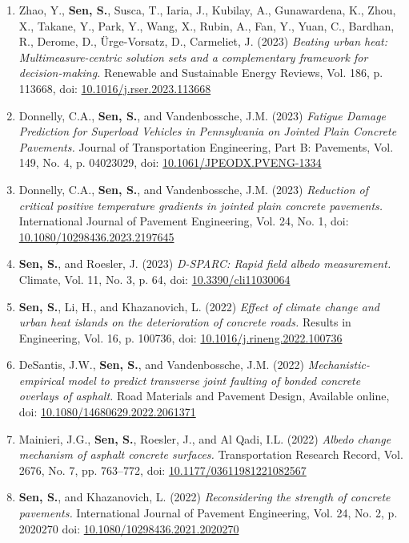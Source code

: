 \documentclass[12pt]{article}
\begin{document}
\begin{enumerate}
	\item Zhao, Y., \textbf{Sen, S.}, Susca, T., Iaria, J., Kubilay, A., Gunawardena, K., Zhou, X., Takane, Y., Park, Y., Wang, X., Rubin, A., Fan, Y., Yuan, C., Bardhan, R., Derome, D., Ürge-Vorsatz, D., Carmeliet, J. (2023) \textit{Beating urban heat: Multimeasure-centric solution sets and a complementary framework for decision-making.} Renewable and Sustainable Energy Reviews, Vol. 186, p. 113668, doi: \href{https://doi.org/10.1016/j.rser.2023.113668}{10.1016/j.rser.2023.113668}
	\item Donnelly, C.A., \textbf{Sen, S.}, and Vandenbossche, J.M. (2023) \textit{Fatigue Damage Prediction for Superload Vehicles in Pennsylvania on Jointed Plain Concrete Pavements.}  Journal of Transportation Engineering, Part B: Pavements, Vol. 149, No. 4, p. 04023029, doi: \href{https://doi.org/10.1061/JPEODX.PVENG-1334}{10.1061/JPEODX.PVENG-1334}
	\item Donnelly, C.A., \textbf{Sen, S.}, and Vandenbossche, J.M. (2023) \textit{Reduction of critical positive temperature gradients in jointed plain concrete pavements.}  International Journal of Pavement Engineering, Vol. 24, No. 1, doi: \href{https://doi.org/10.1080/10298436.2023.2197645}{10.1080/10298436.2023.2197645}
	\item \textbf{Sen, S.}, and Roesler, J. (2023) \textit{D-SPARC: Rapid field albedo measurement.}  Climate, Vol. 11, No. 3, p. 64, doi: \href{https://doi.org/10.3390/cli11030064}{10.3390/cli11030064}
	\item \textbf{Sen, S.}, Li, H., and Khazanovich, L. (2022) \textit{Effect of climate change and urban heat islands on the deterioration of concrete roads.} Results in Engineering, Vol. 16, p. 100736, doi: \href{https://doi.org/10.1016/j.rineng.2022.100736}{10.1016/j.rineng.2022.100736}
	\item DeSantis, J.W., \textbf{Sen, S.}, and Vandenbossche, J.M. (2022) \textit{Mechanistic-empirical model to predict transverse joint faulting of bonded concrete overlays of asphalt.} Road Materials and Pavement Design, Available online, doi: \href{https://doi.org/10.1080/14680629.2022.2061371}{10.1080/14680629.2022.2061371}
	\item Mainieri, J.G., \textbf{Sen, S.}, Roesler, J., and Al Qadi, I.L. (2022) \textit{Albedo change mechanism of asphalt concrete surfaces.} Transportation Research Record, Vol. 2676, No. 7, pp. 763–772, doi: \href{https://doi.org/10.1177/036119812210825670}{10.1177/03611981221082567}
	\item \textbf{Sen, S.}, and Khazanovich, L. (2022) \textit{Reconsidering the strength of concrete pavements.} International Journal of Pavement Engineering, Vol. 24, No. 2, p. 2020270 doi: \href{https://doi.org/10.1080/10298436.2021.2020270}{10.1080/10298436.2021.2020270}

\end{enumerate}
\end{document}
